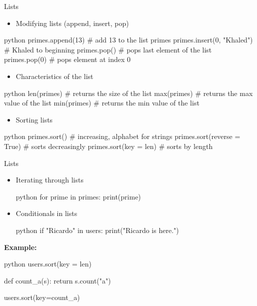 \documentclass[
	11pt, 
]{beamer}
\begin{document}
\begin{frame}[fragile]{Lists}

\begin{itemize}
    \item Modifying lists (append, insert, pop)
\end{itemize}
\begin{mintedbox}{python}
primes.append(13) # add 13 to the list primes
primes.insert(0, "Khaled") # Khaled to beginning
primes.pop() # pops last element of the list
primes.pop(0) # pops element at index 0
\end{mintedbox} 
\begin{itemize}
    \item Characteristics of the list
\end{itemize}
\begin{mintedbox}{python}
len(primes) # returns the size of the list
max(primes) # returns the max value of the list
min(primes) # returns the min value of the list
\end{mintedbox}   
\begin{itemize}
    \item Sorting lists
\end{itemize}
\begin{mintedbox}{python}
primes.sort() # increasing, alphabet for strings
primes.sort(reverse = True) # sorts decreasingly
primes.sort(key = len) # sorts by length
\end{mintedbox}      
\end{frame}


\begin{frame}[fragile]{Lists}
\begin{itemize}
    \item Iterating through lists
\begin{mintedbox}{python}
for prime in primes:
    print(prime)
\end{mintedbox}    
    \item Conditionals in lists
\begin{mintedbox}{python}
if "Ricardo" in users:
    print("Ricardo is here.")
\end{mintedbox}
\end{itemize}
\textbf{Example:}

\begin{mintedbox}{python}
users.sort(key = len)

def count_a(s):
    return s.count("a")
    
users.sort(key=count_a)
\end{mintedbox}
\end{frame}
\end{document}
